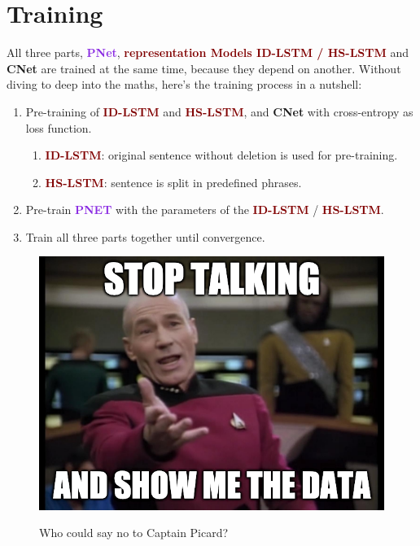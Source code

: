 \documentclass{article}
\begin{document}
\section{Training}\label{sec:training}
All three parts, \textcolor{BlueViolet}{\textbf{PNet}}, \textcolor{Maroon}{\textbf{representation Models ID-LSTM / HS-LSTM}} and \textcolor{yelloww}{\textbf{CNet}} are trained at the same time, because they depend on another. Without diving to deep into the maths, here's the training process in a nutshell:
\begin{enumerate}
    \item Pre-training of \textcolor{Maroon}{\textbf{ID-LSTM}} and \textcolor{Maroon}{\textbf{HS-LSTM}}, and \textcolor{yelloww}{\textbf{CNet}} with cross-entropy as loss function.
    \begin{enumerate}
        \item \textcolor{Maroon}{\textbf{ID-LSTM}}: original sentence without deletion is used for pre-training.
        \item \textcolor{Maroon}{\textbf{HS-LSTM}}: sentence is split in predefined phrases.
    \end{enumerate}
    \item Pre-train \textcolor{BlueViolet}{\textbf{PNET}} with the parameters of the \textcolor{Maroon}{\textbf{ID-LSTM}} / \textcolor{Maroon}{\textbf{HS-LSTM}}.
    \item Train all three parts together until convergence.
    
\end{enumerate}
\begin{figure}[h]
    \centering
\includegraphics[scale=.4]{data.png}
    \label{fig:my_label}
    \caption{Who could say no to Captain Picard?}
\end{figure}
\end{document}
